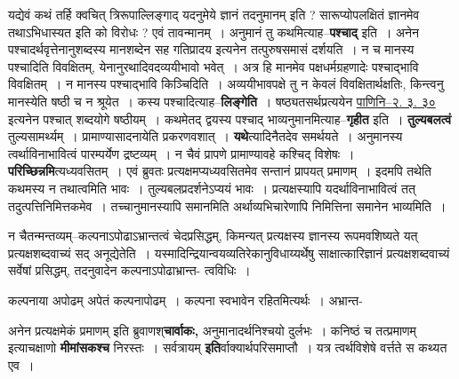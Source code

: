 \documentclass[article,12pt,a4paper]{memoir}
\begin{document}
	  \pstart यद्येवं कथं तर्हि क्वचित् त्रिरूपाल्लिङ्गाद् यदनुमेये ज्ञानं तदनुमानम् इति ? सारूप्योपलक्षितं ज्ञानमेव तथाऽभिधास्यत इति को विरोधः ? एवं तावन्मानम् । अनुमानं तु कथमित्याह--\textbf{पश्चाद्} इति । अनेन पश्चादर्थवृत्तेनानुशब्दस्य मानशब्देन सह गतिप्रादय  इत्यनेन तत्पुरुषसमासं दर्शयति । न च मानस्य पश्चादिति \leavevmode{} विवक्षितम्, येनानुरथादिवदव्ययीभावो भवेत् । अत्र हि मानमेव पक्षधर्मग्रहणादेः पश्चाद्भावि विवक्षितम् । न मानस्य पश्चाद्भावि किञ्चिदिति । अव्ययीभावपक्षे तु न केवलं विवक्षितार्थक्षतिः, किन्त्वनु मानस्येति षष्ठी च न श्रूयेत । कस्य पश्चादित्याह--\textbf{लिङ्गेति} । षष्ठ्यतसर्थप्रत्ययेन \href{http://sarit.indology.info/?cref=Pā.2.3.30}{पाणिनि--२. ३. ३०} इत्यनेन पश्चात् शब्दयोगे षष्ठीयम् । कथमेतद् द्वयस्य पश्चाद् भाव्यनुमानमित्याह--\textbf{गृहीत} इति । \textbf{तुल्यबलत्वं} तुल्यसामर्थ्यम् । प्रामाण्यासादनायेति प्रकरणवशात् । \textbf{यथे}त्यादिनैतदेव समर्थयते । अनुमानस्य त्वर्थाविनाभावित्वं पारम्पर्येण द्रष्टव्यम् । न चैवं प्रापणे प्रामाण्यावहे कश्चिद् विशेषः । \textbf{परिच्छिन्नमि}त्यध्यवसितम् । एवं ब्रुवतः प्रत्यक्षमप्यध्यवसितमेव सन्तानं प्रापयत् प्रमाणम् । इदमपि तथेति कथमस्य न तथात्वमिति भावः । तुल्यबलप्रदर्शनेऽप्ययं भावः । प्रत्यक्षस्यापि यदर्थाविनाभावित्वं तत् तदुत्पत्तिनिमित्तकमेव । तच्चानुमानस्यापि समानमिति अर्थाव्यभिचारेणापि निमित्तिना समानेन भाव्यमिति ।
	\pend
	  \bigskip
	  \begingroup
	

	  \pstart न चैतन्मन्तव्यम्--कल्पनाऽपोढाऽभ्रान्तत्वं चेदप्रसिद्धम्, किमन्यत् प्रत्यक्षस्य ज्ञानस्य रूपमवशिष्यते यत् प्रत्यक्षशब्दवाच्यं सद् अनूद्येतेति । यस्मादिन्द्रियान्वयव्यतिरेकानुविधाय्यर्थेषु साक्षात्कारिज्ञानं प्रत्यक्षशब्दवाच्यं सर्वेषां प्रसिद्धम्, तदनुवादेन कल्पनाऽपोढाभ्रान्त- त्वविधिः ।
	\pend
        

	  \pstart कल्पनाया अपोढम् अपेतं कल्पनापोढम् । कल्पना स्वभावेन रहितमित्यर्थः । अभ्रान्त-
	\pend
      
	  \endgroup
	

	  \pstart अनेन प्रत्यक्षमेकं प्रमाणम् इति ब्रुवाणश्\textbf{चार्वाकः,} अनुमानादर्थनिश्चयो दुर्लभः । कनिष्ठं च तत्प्रमाणम् इत्याचक्षाणो \textbf{मीमांसकश्च} निरस्तः । सर्वत्रायम् \textbf{इति}र्वाक्यार्थपरिसमाप्तौ । यत्र त्वर्थविशेषे वर्त्तते स कथ्यत एव ।
	\pend
      
\end{document}
